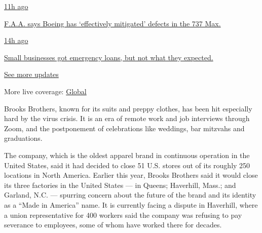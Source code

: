 \href{https://www.nytimes3xbfgragh.onion/live/2020/08/03/business/stock-market-today-coronavirus?action=click\&pgtype=Article\&state=default\&region=MAIN_CONTENT_1\&context=storylines_live_updates\#faa-says-boeing-has-effectively-mitigated-defects-in-the-737-max}{11h
ago}

\href{https://www.nytimes3xbfgragh.onion/live/2020/08/03/business/stock-market-today-coronavirus?action=click\&pgtype=Article\&state=default\&region=MAIN_CONTENT_1\&context=storylines_live_updates\#faa-says-boeing-has-effectively-mitigated-defects-in-the-737-max}{F.A.A.
says Boeing has `effectively mitigated' defects in the 737 Max.}

\href{https://www.nytimes3xbfgragh.onion/live/2020/08/03/business/stock-market-today-coronavirus?action=click\&pgtype=Article\&state=default\&region=MAIN_CONTENT_1\&context=storylines_live_updates\#small-businesses-got-emergency-loans-but-not-what-they-expected}{14h
ago}

\href{https://www.nytimes3xbfgragh.onion/live/2020/08/03/business/stock-market-today-coronavirus?action=click\&pgtype=Article\&state=default\&region=MAIN_CONTENT_1\&context=storylines_live_updates\#small-businesses-got-emergency-loans-but-not-what-they-expected}{Small
businesses got emergency loans, but not what they expected.}

\href{https://www.nytimes3xbfgragh.onion/live/2020/08/03/business/stock-market-today-coronavirus?action=click\&pgtype=Article\&state=default\&region=MAIN_CONTENT_1\&context=storylines_live_updates}{See
more updates}

More live coverage:
\href{https://www.nytimes3xbfgragh.onion/2020/08/03/world/coronavirus-covid-19.html?action=click\&pgtype=Article\&state=default\&region=MAIN_CONTENT_1\&context=storylines_live_updates}{Global}

Brooks Brothers, known for its suits and preppy clothes, has been hit
especially hard by the virus crisis. It is an era of remote work and job
interviews through Zoom, and the postponement of celebrations like
weddings, bar mitzvahs and graduations.

The company, which is the oldest apparel brand in continuous operation
in the United States, said it had decided to close 51 U.S. stores out of
its roughly 250 locations in North America. Earlier this year, Brooks
Brothers said it would close its three factories in the United States
--- in Queens; Haverhill, Mass.; and Garland, N.C. --- spurring concern
about the future of the brand and its identity as a ``Made in America''
name. It is currently facing a dispute in Haverhill, where a union
representative for 400 workers said the company was refusing to pay
severance to employees, some of whom have worked there for decades.

